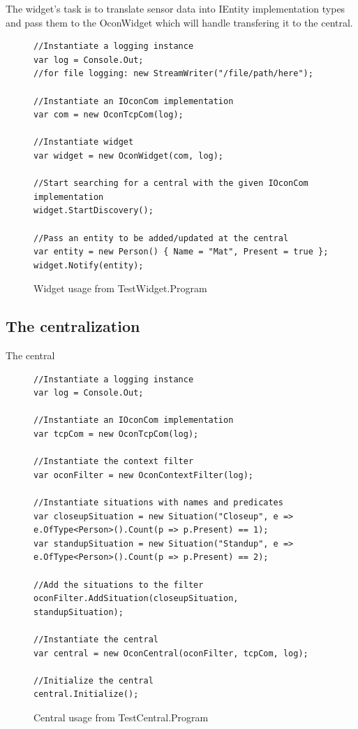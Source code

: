 \documentclass[../report.tex]{subfiles}
\begin{document}
The widget's task is to translate sensor data into IEntity implementation types and pass them to the OconWidget which will handle transfering it to the central.
\begin{figure}[H]
\begin{lstlisting}
//Instantiate a logging instance
var log = Console.Out;
//for file logging: new StreamWriter("/file/path/here");

//Instantiate an IOconCom implementation
var com = new OconTcpCom(log);

//Instantiate widget
var widget = new OconWidget(com, log);

//Start searching for a central with the given IOconCom implementation
widget.StartDiscovery();

//Pass an entity to be added/updated at the central
var entity = new Person() { Name = "Mat", Present = true };
widget.Notify(entity);
\end{lstlisting}
\caption{Widget usage from TestWidget.Program}
\label{code:OconWidget}
\end{figure}



\subsection{The centralization}
The central
\begin{figure}[H]
\begin{lstlisting}
//Instantiate a logging instance
var log = Console.Out;

//Instantiate an IOconCom implementation
var tcpCom = new OconTcpCom(log);

//Instantiate the context filter
var oconFilter = new OconContextFilter(log);

//Instantiate situations with names and predicates
var closeupSituation = new Situation("Closeup", e => e.OfType<Person>().Count(p => p.Present) == 1);
var standupSituation = new Situation("Standup", e => e.OfType<Person>().Count(p => p.Present) == 2);

//Add the situations to the filter
oconFilter.AddSituation(closeupSituation, standupSituation);

//Instantiate the central
var central = new OconCentral(oconFilter, tcpCom, log);

//Initialize the central
central.Initialize();
\end{lstlisting}
\caption{Central usage from TestCentral.Program}
\label{code:OconCentral}
\end{figure}
\end{document}
